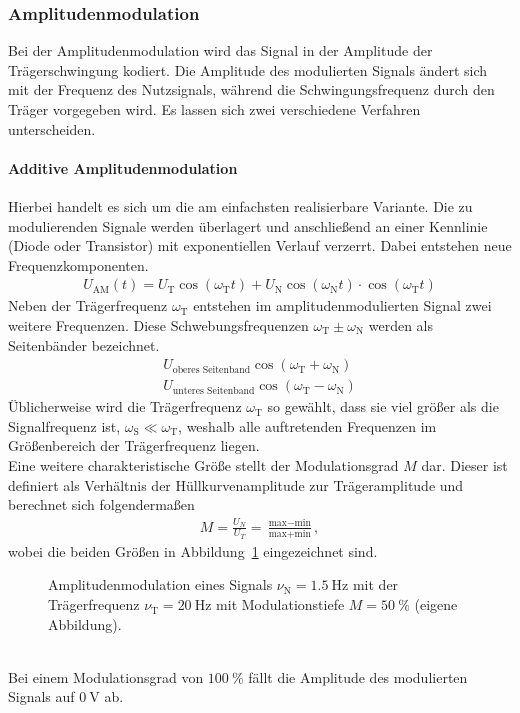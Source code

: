 \documentclass[a4paper,twoside,final]{article}
\begin{document}
\subsubsection{Amplitudenmodulation}
Bei der Amplitudenmodulation wird das Signal in der Amplitude der Trägerschwingung kodiert. Die Amplitude des modulierten Signals ändert sich mit der Frequenz des Nutzsignals, während die Schwingungsfrequenz durch den Träger vorgegeben wird. Es lassen sich zwei verschiedene Verfahren unterscheiden.
\paragraph{Additive Amplitudenmodulation}
Hierbei handelt es sich um die am einfachsten realisierbare Variante. Die zu modulierenden Signale werden überlagert und anschließend an einer Kennlinie (Diode oder Transistor) mit exponentiellen Verlauf verzerrt. Dabei entstehen neue Frequenzkomponenten.
\begin{align}
  U_\text{AM}(t) = U_\text{T}\cos(\omega_\text{T}t) + U_\text{N}\cos(\omega_\text{N}t)\cdot\cos(\omega_\text{T}t)\label{eqn:AM_additiv}
\end{align}
Neben der Trägerfrequenz $\omega_\text{T}$ entstehen im amplitudenmodulierten Signal zwei weitere Frequenzen. Diese Schwebungsfrequenzen $\omega_\text{T} \pm \omega_\text{N}$ werden als Seitenbänder bezeichnet.
\begin{align}
  U_\text{oberes Seitenband}\cos(\omega_\text{T} + \omega_\text{N})\\
  U_\text{unteres Seitenband}\cos(\omega_\text{T} - \omega_\text{N})
\end{align}
Üblicherweise wird die Trägerfrequenz $\omega_\text{T}$ so gewählt, dass sie viel größer als die Signalfrequenz ist, $\omega_\text{S} \ll \omega_\text{T}$, weshalb alle auftretenden Frequenzen im Größenbereich der Trägerfrequenz liegen.\\
Eine weitere charakteristische Größe stellt der Modulationsgrad $M$ dar. Dieser ist definiert als Verhältnis der Hüllkurvenamplitude zur Trägeramplitude und berechnet sich folgendermaßen
\begin{align}
  M = \frac{U_N}{U_T} = \frac{\text{max}-\text{min}}{\text{max}+\text{min}},\label{eqn:Modulationsgrad}
\end{align}
wobei die beiden Größen in Abbildung~\ref{fig:Amplitudenmodulation} eingezeichnet sind.
\begin{figure}[htp]
    \centering
        
    \caption{Amplitudenmodulation eines Signals $\nu_\text{N} = \SI{1.5}{\hertz}$ mit der Trägerfrequenz $\nu_\text{T} = \SI{20}{\hertz}$ mit Modulationstiefe $M = \SI{50}{\percent}$ (eigene Abbildung).}
    \label{fig:Amplitudenmodulation}
\end{figure}\\
Bei einem Modulationsgrad von $\SI{100}{\percent}$ fällt die Amplitude des modulierten Signals auf $\SI{0}{\volt}$ ab.
\end{document}
